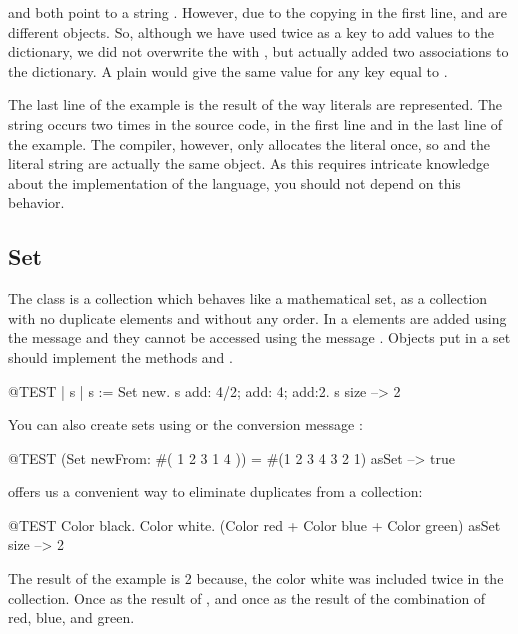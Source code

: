 \documentclass[a4paper,10pt,twoside]{book}
\begin{document}
\noindent
{} and  both point to a string . However, due to the copying in the first line,  and  are different objects. So, although we have used  twice as a key to add values to the dictionary, we did not overwrite the  with , but actually added two associations to the dictionary.
A plain  would give the same value for any key equal to .

The last line of the example is the result of the way literals are represented. The string  occurs two times in the source code, in the first line and in the last line of the example. The compiler, however, only allocates the literal once, so  and the literal string  are actually the same object. As this requires intricate knowledge about the implementation of the language, you should not depend on this behavior.


\subsection{Set}
The class  is a collection which behaves like a mathematical set, \ie as a collection with no duplicate elements and without any order.
In a  elements are added using the message  and they cannot be accessed using the message .
Objects put in a set should implement the methods  and \ct{=}.

\begin{code}{@TEST | s | }
s := Set new.
s add: 4/2; add: 4; add:2.
s size --> 2
\end{code}

You can also create sets using  or the conversion message :

\begin{code}{@TEST}
(Set newFrom: #( 1 2 3 1 4 )) = #(1 2 3 4 3 2 1) asSet --> true
\end{code}

 offers us a convenient way to eliminate duplicates from a collection:

\begin{code}{@TEST}
{Color black. Color white. (Color red + Color blue + Color green)} asSet size --> 2
\end{code}

\noindent
The result of the example is 2 because, the color white was included twice in the collection. Once as the result of , and once as the result of the combination of red, blue, and green.
\end{document}
